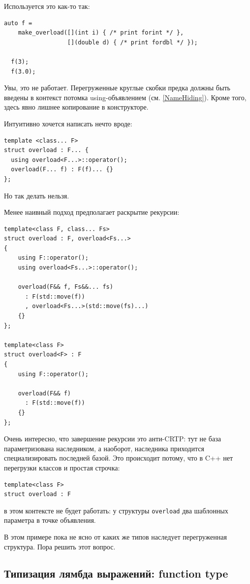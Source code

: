 \documentclass[a4paper,12pt,oneside]{book}
\begin{document}
Используется это как-то так:

\begin{lstlisting}
auto f =
    make_overload([](int i) { /* print forint */ },
                  [](double d) { /* print fordbl */ });

  f(3);
  f(3.0);
\end{lstlisting}

Увы, это не работает. Перегруженные круглые скобки предка должны быть введены в контекст потомка using-объявлением (см. \ref{NameHiding}). Кроме того, здесь явно лишнее копирование в конструкторе.

Интуитивно хочется написать нечто вроде:

\begin{lstlisting}
template <class... F>
struct overload : F... {
  using overload<F...>::operator();
  overload(F... f) : F(f)... {} 
};
\end{lstlisting}

Но так делать нельзя.

Менее наивный подход предполагает раскрытие рекурсии:

\begin{lstlisting}
template<class F, class... Fs>
struct overload : F, overload<Fs...>
{
    using F::operator();
    using overload<Fs...>::operator();

    overload(F&& f, Fs&&... fs)
      : F(std::move(f))
      , overload<Fs...>(std::move(fs)...)
    {}
};

template<class F>
struct overload<F> : F
{
    using F::operator();

    overload(F&& f)
      : F(std::move(f))
    {}
};
\end{lstlisting}

Очень интересно, что завершение рекурсии это анти-CRTP: тут не база параметризована наследником, а наоборот, наследника приходится специализировать последней базой. Это происходит потому, что в C++ нет перегрузки классов и простая строчка:

\begin{lstlisting}
template<class F>
struct overload : F
\end{lstlisting}

в этом контексте не будет работать: у структуры \lstinline!overload! два шаблонных параметра в точке объявления.

В этом примере пока не ясно от каких же типов наследует перегруженная структура. Пора решить этот вопрос.

\subsection{Типизация лямбда выражений: function type}\label{StdFunction}
\end{document}
